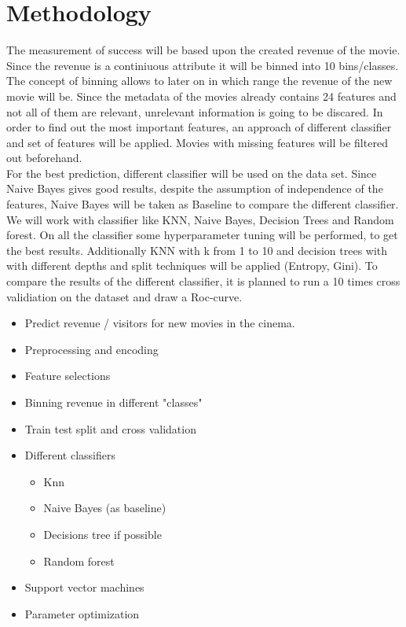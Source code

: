 \section{Methodology}

The measurement of success will be based upon the created revenue of the movie. Since the revenue is a continiuous attribute it will be binned into 10 bins/classes. The concept of binning allows to later on in which range the revenue of the new movie will be.
Since the metadata of the movies already contains 24 features and not all of them are relevant, unrelevant information is going to be discared. In order to find out the most important features, an approach of different classifier and set of features will be applied. Movies with missing features will be filtered out beforehand. \\
For the best prediction, different classifier will be used on the data set. Since Naive Bayes gives good results, despite the assumption of independence of the features, Naive Bayes will be taken as Baseline to compare the different classifier. We will work with classifier like KNN, Naive Bayes, Decision Trees and Random forest. On all the classifier some hyperparameter tuning will be performed, to get the best results. Additionally KNN with k from 1 to 10 and decision trees with with different depths and split techniques will be applied (Entropy, Gini).
To compare the results of the different classifier, it is planned to run a 10 times cross validiation on the dataset and draw a Roc-curve.
\begin{itemize}
	\item Predict revenue / visitors for new movies in the cinema. 
	\item Preprocessing and encoding
	\item Feature selections
	\item Binning revenue in different "classes"
	\item Train test split and cross validation
	\item Different classifiers
	\begin{itemize}
		\item Knn
		\item Naive Bayes (as baseline)
		\item Decisions tree if possible
		\item Random forest
	\end{itemize}
	\item Support vector machines
	\item Parameter optimization
\end{itemize}


